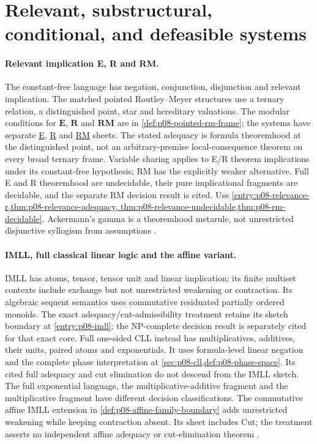 \section{Relevant, substructural, conditional, and defeasible systems}
\label{sec:p14-directory-relevant-defeasible}

\paragraph{Relevant implication E, R and RM.}
\label{entry:p14-directory-relevance}
The constant-free language has negation, conjunction, disjunction and
relevant implication. The matched pointed Routley--Meyer structures use
a ternary relation, a distinguished point, star and hereditary valuations.
The modular conditions for \(\mathbf E\), \(\mathbf R\) and
\(\mathbf{RM}\) are in \cref{def:p08-pointed-rm-frame}; the systems
have separate \hyperref[sheet:relevance-e]{E},
\hyperref[sheet:relevance-r]{R} and
\hyperref[sheet:relevance-rm]{RM} sheets. The stated adequacy is formula
theoremhood at the distinguished point, not an arbitrary-premise
local-consequence theorem on every broad ternary frame.
Variable sharing applies to E/R theorem implications under its
constant-free hypothesis; RM has the explicitly weaker alternative.
Full E and R theoremhood are undecidable, their pure implicational
fragments are decidable, and the separate RM decision result is cited.
Use \cref{entry:p08-relevance-r,thm:p08-relevance-adequacy,
thm:p08-relevance-undecidable,thm:p08-rm-decidable}.
Ackermann's gamma is a theoremhood metarule, not unrestricted disjunctive
syllogism from assumptions \cite{AndersonBelnap1975,RoutleyMeyer1973,
MeyerDunn1969,DunnRestall2002,Urquhart1984,Avron2016}.

\paragraph{IMLL, full classical linear logic and the affine variant.}
\label{entry:p14-directory-linear}
IMLL has atoms, tensor, tensor unit and linear implication; its finite
multiset contexts include exchange but not unrestricted weakening or
contraction. Its algebraic sequent semantics uses commutative residuated
partially ordered monoids. The exact adequacy/cut-admissibility treatment
retains its sketch boundary at \cref{entry:p08-imll}; the NP-complete
decision result is separately cited for that exact core.
Full one-sided CLL instead has multiplicatives, additives, their units,
paired atoms and exponentials. It uses formula-level linear negation
and the complete phase interpretation at
\cref{sec:p08-cll,def:p08-phase-space}. Its cited full adequacy and cut
elimination do not descend from the IMLL sketch. The full exponential
language, the multiplicative-additive fragment and the multiplicative
fragment have different decision classifications.
The commutative affine IMLL extension in
\cref{def:p08-affine-family-boundary} adds unrestricted weakening while
keeping contraction absent. Its sheet includes Cut; the treatment asserts
no independent affine adequacy or cut-elimination theorem
\cite{Girard1987,Girard1995,Lincoln1995,LincolnMitchellScedrovShankar1992}.

